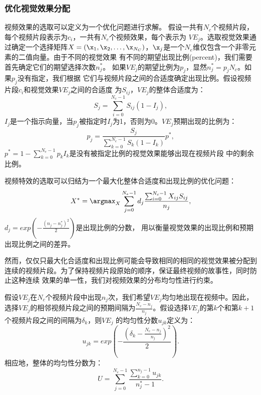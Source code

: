 \subsubsection{优化视觉效果分配}
视频效果的选取可以定义为一个优化问题进行求解。
假设一共有$N_c$个视频片段，每个视频片段表示为$c_i$，一共有$N_e$个视频效果，每个表示为
$VE_j$。选取视觉效果通过确定一个选择矩阵$X=(\x_1, \x_2, \ldots,
\x_{N_C})$，$\x_j$是一个$N_e$维仅包含一个非零元素的二值向量。由于不同的视觉效果
有不同的期望出现比例(percent)，我们需要首先确定它们的期望选择次数$n_j^*$。
如果$VE_j$的期望比例为$p_j$，显然$n_j^* = p_jN_c$。如果$p_j$没有指定，我们根据
它们与视频片段之间的合适度确定出现比例。假设视频片段$c_i$和视觉效果$VE_j$之间的合适度
为$S_{ij}$，$VE_j$的整体合适度为：
\begin{equation}
    S_j = \sum_{i=0}^{N_c-1}S_{ij}(1 - I_j),
\end{equation}
$I_j$是一个指示向量，当$p_j$被指定时$I_j$为1，否则为0。$VE_j$预期出现的比例为：
\begin{equation}
    p_j = \frac{S_j}{\sum_{k=0}^{N_e-1}S_{k}(1 - I_{k})}p^*,
\end{equation}
$p^* = 1 -\sum_{k=0}^{N_e-1}p_{k}I_{k}$是没有被指定比例的视觉效果能够出现在视频片段
中的剩余比例。

视频特效的选取可以归结为一个最大化整体合适度和出现比例的优化问题：
\begin{equation}
    X^* = \argmax_{X}
    \sum_{j=0}^{N_e-1}d_j\frac{\sum_{i=0}^{N_c-1}X_{ij}S_{ij}}{n_j},
\end{equation}
$d_j = exp(-\frac{(n_j-n_j^*)^2}{2})$是出现比例的分数，
用以衡量视觉效果的出现比例和预期出现比例之间的差异。

然而，仅仅只最大化合适度和出现比例可能会导致相同的相同的视觉效果被分配到
连续的视频片段。为了保持视频片段原始的顺序，保证最终视频的故事性，同时防止这种连续
效果的单一性，我们对视频效果的分布均匀性进行约束。

假设$VE_j$在$N_c$个视频片段中出现$n_j$次，我们希望$VE_j$均匀地出现在视频中。因此，
选择$VE_j$的相邻视频片段之间的预期间隔为$\frac{N_c -
n_j}{n_j}$。假设选择$VE_j$的第$k$个和第$k+1$个视频片段之间的间隔为$\delta_k$，则$VE_j$
的均匀性分数$u_{jk}$定义为：
\begin{equation}
    u_{jk} = exp(-\frac{(\delta_{k}-\frac{N_c-n_j}{n_j})^2}{2}).
\end{equation}
相应地，整体的均匀性分数为：
\begin{equation}
    U = \sum_{j=0}^{N_e-1}\frac{\sum_{k=0}^{n_j-1}u_{jk}}{n_j^*-1}.
\end{equation}

